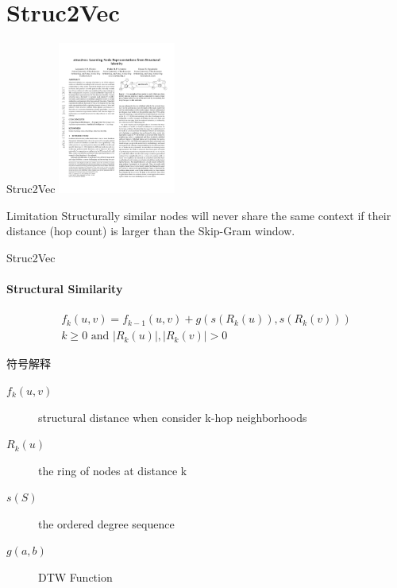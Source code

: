 \documentclass{beamer}
\begin{document}
\section{Struc2Vec}
\begin{frame}{Struc2Vec}
    \centering\includegraphics[height=5cm]{struc2vec.pdf}
    \begin{block}{Limitation}
        Structurally similar nodes will never share the same context if their distance (hop count) is larger than the Skip-Gram window.
    \end{block}
\end{frame}
\begin{frame}{Struc2Vec}
    \framesubtitle{Structural Similarity}
    \begin{equation}
        \begin{gathered}
        f_{k}(u, v)=f_{k-1}(u, v)+g\left(s\left(R_{k}(u)\right), s\left(R_{k}(v)\right)\right) \\
        k \geq 0 \text { and }\left|R_{k}(u)\right|,\left|R_{k}(v)\right|>0
        \end{gathered}
    \end{equation}
    \begin{alertblock}{符号解释}
        \begin{description}
            \item [$f_k(u, v)$] structural distance when consider k-hop neighborhoods
            \item[$R_{k}(u)$] the ring of nodes at distance k
            \item[$s(S)$] the ordered degree sequence
            \item[$g(a, b)$] DTW Function  
        \end{description}
    \end{alertblock}
\end{frame}
\end{document}

